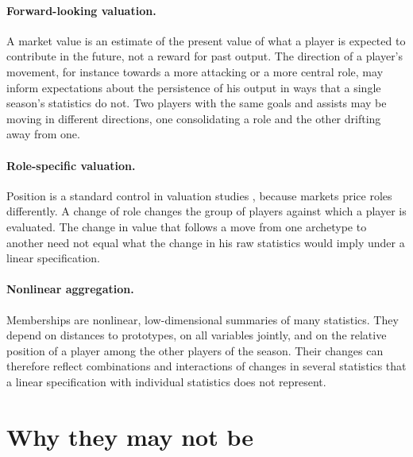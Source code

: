 \paragraph{Forward-looking valuation.} A market value is an estimate of the present value of what a player is expected to contribute in the future, not a reward for past output. The direction of a player's movement, for instance towards a more attacking or a more central role, may inform expectations about the persistence of his output in ways that a single season's statistics do not. Two players with the same goals and assists may be moving in different directions, one consolidating a role and the other drifting away from one.

\paragraph{Role-specific valuation.} Position is a standard control in valuation studies \cite{franceschi2024determinants,poli2024statistical}, because markets price roles differently. A change of role changes the group of players against which a player is evaluated. The change in value that follows a move from one archetype to another need not equal what the change in his raw statistics would imply under a linear specification.

\paragraph{Nonlinear aggregation.} Memberships are nonlinear, low-dimensional summaries of many statistics. They depend on distances to prototypes, on all variables jointly, and on the relative position of a player among the other players of the season. Their changes can therefore reflect combinations and interactions of changes in several statistics that a linear specification with individual statistics does not represent.

\section{Why they may not be}
\label{sec:theory-why-not}

